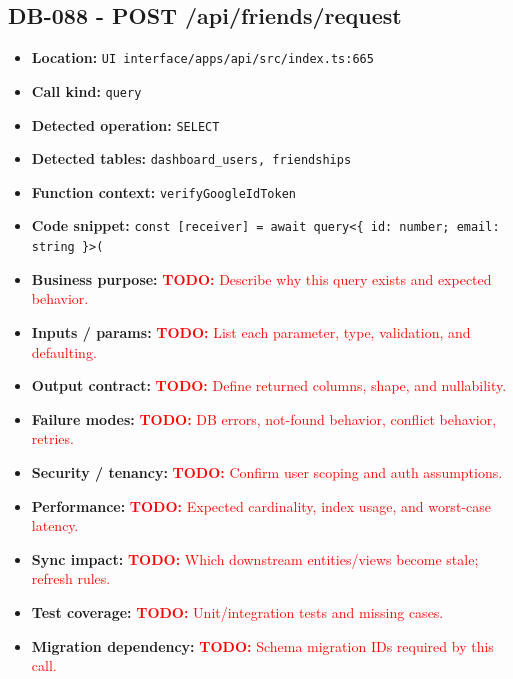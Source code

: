 \documentclass[11pt]{article}
\newcommand{\todoitem}[1]{\textcolor{red}{\textbf{TODO:} #1}}
\begin{document}
\subsection{DB-088 - POST /api/friends/request}
\begin{itemize}[leftmargin=1.5em]
\item \textbf{Location:} \texttt{UI interface/apps/api/src/index.ts:665}
\item \textbf{Call kind:} \texttt{query}
\item \textbf{Detected operation:} \texttt{SELECT}
\item \textbf{Detected tables:} \texttt{dashboard\_users, friendships}
\item \textbf{Function context:} \texttt{verifyGoogleIdToken}
\item \textbf{Code snippet:} \texttt{const [receiver] = await query<\{ id: number; email: string \}>(}
\item \textbf{Business purpose:} \todoitem{Describe why this query exists and expected behavior.}
\item \textbf{Inputs / params:} \todoitem{List each parameter, type, validation, and defaulting.}
\item \textbf{Output contract:} \todoitem{Define returned columns, shape, and nullability.}
\item \textbf{Failure modes:} \todoitem{DB errors, not-found behavior, conflict behavior, retries.}
\item \textbf{Security / tenancy:} \todoitem{Confirm user scoping and auth assumptions.}
\item \textbf{Performance:} \todoitem{Expected cardinality, index usage, and worst-case latency.}
\item \textbf{Sync impact:} \todoitem{Which downstream entities/views become stale; refresh rules.}
\item \textbf{Test coverage:} \todoitem{Unit/integration tests and missing cases.}
\item \textbf{Migration dependency:} \todoitem{Schema migration IDs required by this call.}
\end{itemize}
\end{document}
